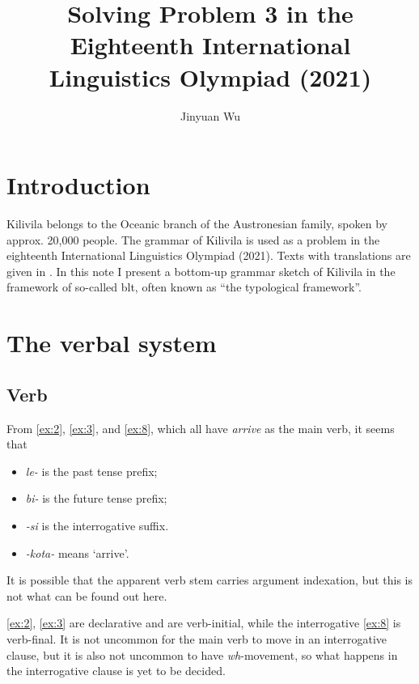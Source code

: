 \documentclass{article}
\title{Solving Problem 3 in the Eighteenth International Linguistics Olympiad (2021)}
\author{Jinyuan Wu}
\newcommand*{\term}[1]{\emph{#1}}
\newcommand*{\corpus}[1]{\emph{#1}}
\begin{document}
\maketitle

\automath

\section{Introduction}

Kilivila belongs to the Oceanic branch of the Austronesian family,
spoken by approx. 20,000 people.
The grammar of Kilivila is used as a problem 
in the eighteenth International Linguistics Olympiad (2021).
Texts with translations are given in .
In this note I present a bottom-up grammar sketch of Kilivila
in the framework of so-called \ac{blt},
often known as ``the typological framework''.

\section{The verbal system}

\subsection{Verb}

From \eqref{ex:2}, \eqref{ex:3}, and \eqref{ex:8}, which all have \corpus{arrive} as the main verb,
it seems that 
\begin{itemize}
    \item \corpus{le-} is the past tense prefix;
    \item \corpus{bi-} is the future tense prefix;
    \item \corpus{-si} is the interrogative suffix.
    \item \corpus{-kota-} means `arrive'.
\end{itemize}
It is possible that the apparent verb stem carries argument indexation,
but this is not what can be found out here.

\eqref{ex:2}, \eqref{ex:3} are declarative and are verb-initial,
while the interrogative \eqref{ex:8} is verb-final.
It is not uncommon for the main verb to move in an interrogative clause,
but it is also not uncommon to have \term{wh}-movement,
so what happens in the interrogative clause is yet to be decided.
\end{document}
